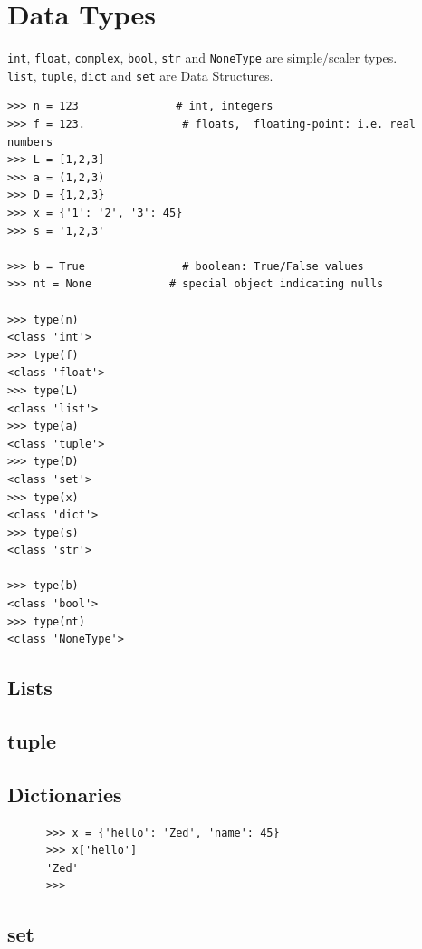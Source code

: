\documentclass[11pt,a4paper]{article}
\begin{document}
\newpage
\section{Data Types}
{\tt int}, {\tt float}, {\tt complex}, {\tt bool}, {\tt str} and {\tt NoneType} are simple/scaler types. \\
{\tt list}, {\tt tuple}, {\tt dict} and {\tt set} are Data Structures. \\

\begin{lstlisting}
>>> n = 123               # int, integers
>>> f = 123.               # floats,  floating-point: i.e. real numbers
>>> L = [1,2,3]           
>>> a = (1,2,3)
>>> D = {1,2,3}
>>> x = {'1': '2', '3': 45}
>>> s = '1,2,3'

>>> b = True               # boolean: True/False values
>>> nt = None            # special object indicating nulls

>>> type(n)
<class 'int'>
>>> type(f)
<class 'float'>
>>> type(L)
<class 'list'>
>>> type(a)
<class 'tuple'>
>>> type(D)
<class 'set'>
>>> type(x)
<class 'dict'>
>>> type(s)
<class 'str'>

>>> type(b)
<class 'bool'>
>>> type(nt)
<class 'NoneType'>
\end{lstlisting}


    \subsection{Lists}

    \subsection{tuple}
    
    \subsection{Dictionaries}
    \begin{lstlisting}
      >>> x = {'hello': 'Zed', 'name': 45}
      >>> x['hello']
      'Zed'
      >>> 
    \end{lstlisting}
    
    \subsection{set}
\end{document}

